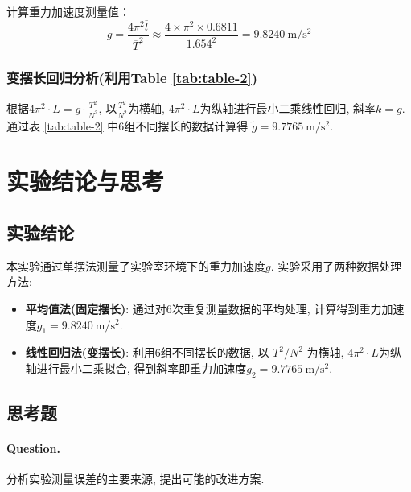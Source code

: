 \documentclass[9pt,a4paper,twoside]{../rho-class/rho}
\begin{document}
计算重力加速度测量值：
\begin{equation}
    g = \frac{4\pi^2 \overline{l}}{\overline{T}^2} \approx \frac{4 \times \pi^2 \times 0.6811}{1.654^2} = \qty{9.8240}{\metre\per\second\squared}
\end{equation}

\subsubsection{变摆长回归分析(利用Table \ref{tab:table-2})}
根据$4 \pi^2 \cdot L = g \cdot \frac{T^2}{N^2}$, 以$\frac{T^2}{N^2}$为横轴, $4 \pi^2 \cdot L$为纵轴进行最小二乘线性回归, 斜率$k = g$.
通过表 \ref{tab:table-2} 中6组不同摆长的数据计算得 $\tilde{g} = \qty{9.7765}{\metre\per\second\squared}$.

\section{实验结论与思考}

\subsection{实验结论}

本实验通过单摆法测量了实验室环境下的重力加速度$g$. 实验采用了两种数据处理方法:
\begin{itemize}
    \item \textbf{平均值法(固定摆长)}: 通过对6次重复测量数据的平均处理, 计算得到重力加速度$g_1 = \qty{9.8240}{\metre\per\second\squared}$.
    \item \textbf{线性回归法(变摆长)}: 利用6组不同摆长的数据, 以 $T^2/N^2$ 为横轴, $4\pi^2 \cdot L$为纵轴进行最小二乘拟合, 得到斜率即重力加速度$g_2 = \qty{9.7765}{\metre\per\second\squared}$.
\end{itemize}

\subsection{思考题}

\paragraph{Question.} 分析实验测量误差的主要来源, 提出可能的改进方案.
\end{document}
